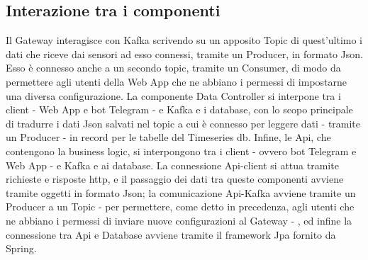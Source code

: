 	\subsection{Interazione tra i componenti}
	Il Gateway interagisce con Kafka scrivendo su un apposito Topic di quest'ultimo i dati che riceve dai sensori ad esso connessi, tramite un Producer, in formato Json. Esso è connesso anche a un secondo topic, tramite un Consumer, di modo da permettere agli utenti della Web App che ne abbiano i permessi di impostarne una diversa configurazione.
La componente Data Controller si interpone tra i client - Web App e bot Telegram - e Kafka e i database, con lo scopo principale di tradurre i dati Json salvati nel topic a cui è connesso per leggere dati - tramite un Producer - in record per le tabelle del Timeseries db.  Infine, le Api, che contengono la business logic, si interpongono tra i client - ovvero bot Telegram e Web App - e Kafka e ai database. La connessione Api-client si attua tramite richieste e risposte http, e il passaggio dei dati tra queste componenti avviene tramite oggetti in formato Json; la comunicazione Api-Kafka avviene tramite un Producer a un Topic - per permettere, come detto in precedenza, agli utenti che ne abbiano i permessi di inviare nuove configurazioni al Gateway - , ed infine la connessione tra Api e Database avviene tramite il framework Jpa fornito da Spring.  
	
